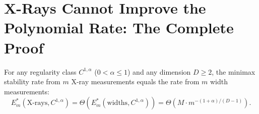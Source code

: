 %
%
%


\section{X-Rays Cannot Improve the Polynomial Rate: The Complete Proof}

\begin{theorem}
\label{thm:center}
For any regularity class $C^{1,\alpha}$ ($0 < \alpha \leq 1$) and any dimension $D \geq 2$, the minimax stability rate from $m$ X-ray measurements equals the rate from $m$ width measurements:
\[
  E_m^*(\text{X-rays}, C^{1,\alpha}) = \Theta\!\left(E_m^*(\text{widths}, C^{1,\alpha})\right) = \Theta\!\left(M \cdot m^{-(1+\alpha)/(D-1)}\right).
\]
\end{theorem}

